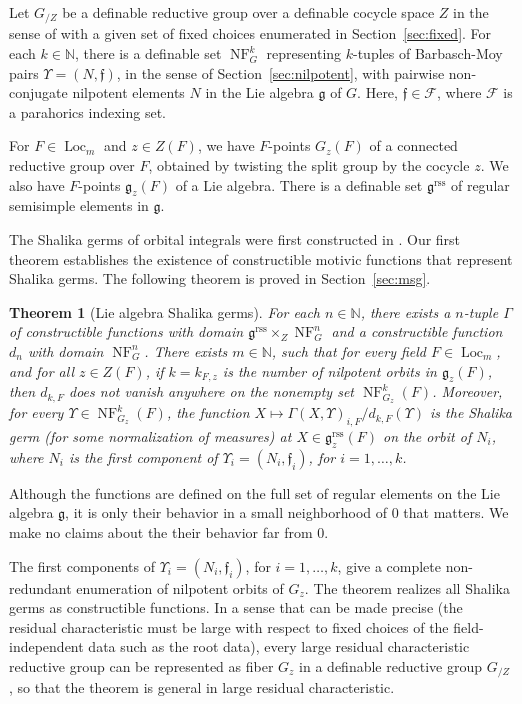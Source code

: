 \documentclass[12pt]{amsart}
\newcommand{\op}[1]{\operatorname{#1}}
\newcommand{\ring}[1]{{\mathbb #1}}
\def\NF{\op{NF}}
\def\Y{\Upsilon}
\def\s{{\mathfrak{f}}}
\newcommand{\cF}{\mathcal{F}}
\newcommand{\fg}{\mathfrak{g}}
\newcommand{\reg}{\mathrm{rss}}
\theoremstyle{plain}
\newtheorem{theorem}[thm]{Theorem}
\theoremstyle{definition}
\begin{document}
Let $G_{/Z}$ be a definable reductive group over a definable cocycle
space $Z$ in the sense of \cite{CGH} with a given set of fixed choices
enumerated in Section~\ref{sec:fixed}.  For each $k\in\ring{N}$, there
is a definable set $\NF^k_G$ representing $k$-tuples of Barbasch-Moy
pairs $\Y=(N,\s)$, in the sense of Section~\ref{sec:nilpotent}, with
pairwise non-conjugate nilpotent elements $N$ in the Lie algebra $\fg$
of $G$.  Here, $\s\in\cF$, where $\cF$ is a parahorics indexing set.

For $F\in \op{Loc}_m$ and $z\in Z(F)$, we have $F$-points $G_z(F)$ of
a connected reductive group over $F$, obtained by twisting the split
group by the cocycle $z$. We also have $F$-points $\fg_z(F)$ of a Lie
algebra. There is a definable set $\fg^\reg$ of regular semisimple
elements in $\fg$.  

The Shalika germs of orbital integrals were first constructed in
\cite{shalika1972theorem}.  Our first theorem establishes the
existence of constructible motivic functions that represent Shalika
germs.  The following theorem is proved in Section~\ref{sec:msg}.




\begin{theorem} [Lie algebra Shalika germs]\label{thm:lie-shalika} 
  For each $n\in \ring{N}$, there exists a $n$-tuple $\Gamma$ of
  constructible functions with domain $\fg^\reg\times_Z \NF^n_G$ and a
  constructible function $d_n$ with domain $\NF^n_G$.  There exists
  $m\in \ring{N}$, such that for every field $F\in \op{Loc}_{m}$, and
  for all $z\in Z(F)$, if $k=k_{F,z}$ is the number of nilpotent
  orbits in $\fg_z(F)$, then $d_{k,F}$ does not vanish anywhere on the
  nonempty set $\NF^{k}_{G_z}(F)$.  Moreover, for every $\Y\in
  \NF^{k}_{G_z}(F)$, the function $X\mapsto
  \Gamma(X,\Y)_{i,F}/d_{k,F}(\Y)$ is the Shalika germ (for some
  normalization of measures) at $X\in \fg^\reg_z(F)$ on the orbit of
  $N_i$, where $N_i$ is the first component of $\Y_i=(N_i,\s_i)$, for
  $i=1,\ldots,k$.
\end{theorem}

Although the functions are defined on the full set of regular elements
on the Lie algebra $\fg$, it is only their behavior in a small
neighborhood of $0$ that matters.  We make no claims about the their
behavior far from $0$.

The first components of $\Y_i=(N_i,\s_i)$, for $i=1,\ldots,k$, give a
complete non-redundant enumeration of nilpotent orbits of $G_z$.  The
theorem realizes all Shalika germs as constructible functions.  In a
sense that can be made precise (the residual characteristic must be
large with respect to fixed choices of the field-independent data such
as the root data), every large residual characteristic reductive group
can be represented as fiber $G_z$ in a definable reductive group $G_{/Z}$,
so that the theorem is general in large residual characteristic.
\end{document}
